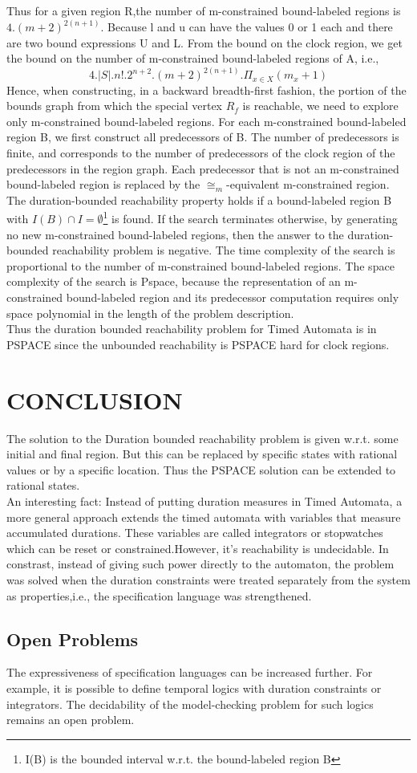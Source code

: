 \documentclass[a4paper,UKenglish,cleveref, autoref, thm-restate]{lipics-v2019}
\begin{document}
Thus for a given region R,the number of m-constrained bound-labeled regions is $4.(m+2)^{2(n+1)}$. Because l and u can have the values 0 or 1 each and there are two bound expressions U and L. From the bound on the clock region, we get the bound on the number of m-constrained bound-labeled regions of A, i.e.,\\
$$4.|S|.n!.2^{n+2}.(m+2)^{2(n+1)}.\Pi_{x\in X}(m_x+1)$$
Hence, when constructing, in a backward breadth-first fashion, the portion of the bounds graph from which the special vertex $R_f$ is reachable, we need to explore only m-constrained
bound-labeled regions. For each m-constrained bound-labeled region B, we first construct all
predecessors of B. The number of predecessors is finite, and corresponds to the number
of predecessors of the clock region of the predecessors in the region graph. Each predecessor
that is not an m-constrained bound-labeled region is replaced by the $\cong_m$-equivalent m-constrained
region. The duration-bounded reachability property holds if a bound-labeled region B with
$I(B) \cap I=\emptyset$\footnote{I(B) is the bounded interval w.r.t. the bound-labeled region B} is found. If the search terminates otherwise, by generating no new m-constrained bound-labeled regions, then the answer to the duration-bounded reachability problem is negative.
The time complexity of the search is proportional to the number of m-constrained bound-labeled
regions. The space complexity of the search is Pspace, because the representation of an m-constrained bound-labeled region and its predecessor computation requires
only space polynomial in the length of the problem description.\\
Thus the duration bounded reachability problem for Timed Automata is in PSPACE since the unbounded reachability is PSPACE hard for clock regions.

\section{CONCLUSION}
The solution to the Duration bounded reachability problem is given w.r.t. some initial and final region. But this can be replaced by specific states with rational values or by a specific location. Thus the PSPACE solution can be extended to rational states.\\
An interesting fact: Instead of putting duration measures in Timed Automata, a more general approach extends the timed automata with variables that measure accumulated durations. These variables are called integrators or stopwatches which can be reset or constrained.However, it's reachability is undecidable.
In constrast, instead of giving such power directly to the automaton, the problem was solved when the duration constraints were treated separately from the system as properties,i.e., the specification language was strengthened.
\subsection{Open Problems}
The expressiveness of specification languages can be increased further. For example,
it is possible to define temporal logics with duration constraints or integrators. The decidability
of the model-checking problem for such logics remains an open problem.
\end{document}
